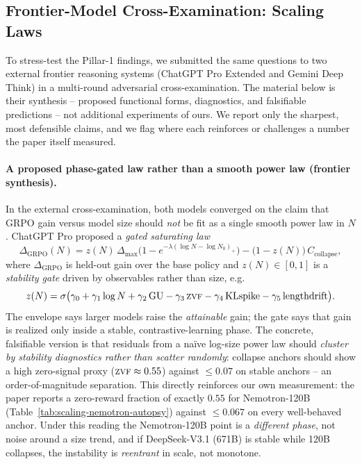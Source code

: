 \documentclass{article}
\providecommand{\tableref}[1]{Table~\ref{#1}}
\begin{document}
\subsection{Frontier-Model Cross-Examination: Scaling Laws}
\label{sec:frontier-scaling}

To stress-test the Pillar-1 findings, we submitted the same questions to two
external frontier reasoning systems (ChatGPT Pro Extended and Gemini Deep
Think) in a multi-round adversarial cross-examination. The material below is
their synthesis -- proposed functional forms, diagnostics, and falsifiable
predictions -- not additional experiments of ours. We report only the
sharpest, most defensible claims, and we flag where each reinforces or
challenges a number the paper itself measured.

\paragraph{A proposed phase-gated law rather than a smooth power law (frontier synthesis).}
In the external cross-examination, both models converged on the claim that
GRPO gain versus model size should \emph{not} be fit as a single smooth power
law in $N$. ChatGPT Pro proposed a \emph{gated saturating law}
\begin{equation}
  \label{eq:frontier-gated}
  \Delta_{\mathrm{GRPO}}(N)
    = z(N)\,\Delta_{\max}\bigl(1 - e^{-\lambda(\log N - \log N_0)_+}\bigr)
      - \bigl(1 - z(N)\bigr)\,C_{\mathrm{collapse}},
\end{equation}
where $\Delta_{\mathrm{GRPO}}$ is held-out gain over the base policy and
$z(N)\in[0,1]$ is a \emph{stability gate} driven by observables rather than
size, e.g.
\begin{equation}
  \label{eq:frontier-gate}
  z(N) = \sigma\bigl(\gamma_0 + \gamma_1 \log N + \gamma_2\,\mathrm{GU}
         - \gamma_3\,\textsc{zvf} - \gamma_4\,\mathrm{KLspike}
         - \gamma_5\,\mathrm{lengthdrift}\bigr).
\end{equation}
The envelope says larger models raise the \emph{attainable} gain; the gate
says that gain is realized only inside a stable, contrastive-learning phase.
The concrete, falsifiable version is that residuals from a na\"ive log-size
power law should \emph{cluster by stability diagnostics rather than scatter
randomly}: collapse anchors should show a high zero-signal proxy
($\textsc{zvf}\approx 0.55$) against $\le 0.07$ on stable anchors -- an
order-of-magnitude separation. This directly reinforces our own measurement:
the paper reports a zero-reward fraction of exactly $0.55$ for Nemotron-120B
(\tableref{tab:scaling-nemotron-autopsy}) against $\le 0.067$ on every
well-behaved anchor. Under this reading the Nemotron-120B point is a
\emph{different phase}, not noise around a size trend, and if DeepSeek-V3.1
(671B) is stable while 120B collapses, the instability is \emph{reentrant} in
scale, not monotone.
\end{document}
